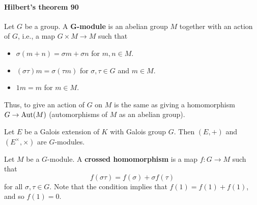\paragraph{Hilbert's theorem 90}
Let $G$ be a group. A \textbf{$\bm{G}$-module} is an abelian group $M$ together with an action of $G$, i.e., a map $G\times M\to M$ such that
\begin{itemize}
\item $\sigma(m+n)=\sigma m+\sigma n$ for $m,n\in M$.
\item $(\sigma\tau)m=\sigma(\tau m)$ for $\sigma,\tau\in G$ and $m\in M$.
\item $1m=m$ for $m\in M$.
\end{itemize}
Thus, to give an action of $G$ on $M$ is the same as giving a homomorphism $G\to\mathrm{Aut}(M)$ (automorphisms of $M$ as an abelian group).
\begin{example}
Let $E$ be a Galois extension of $K$ with Galois group $G$. Then $(E,+)$ and $(E^\times,\times)$ are $G$-modules.
\end{example}
Let $M$ be a $G$-module. A \textbf{crossed homomorphism} is a map $f:G\to  M$ such that
\[f(\sigma\tau)=f(\sigma)+\sigma f(\tau)\]
for all $\sigma,\tau\in G$. Note that the condition implies that $f(1)=f(1)+f(1)$, and so $f(1)=0$.
